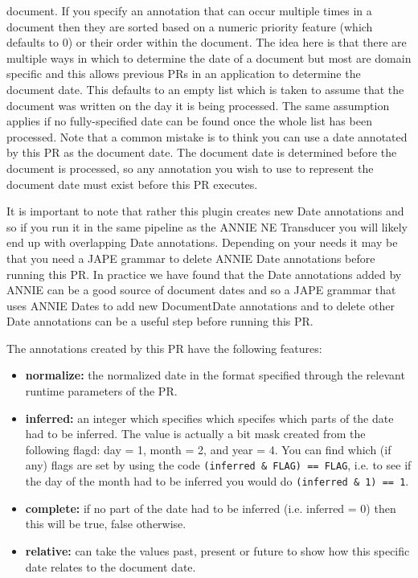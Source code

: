 \begin{itemize}
  document. If you specify an annotation that can occur multiple times in a
  document then they are sorted based on a numeric priority feature (which defaults
  to 0) or their order within the document. The idea here is that there are 
  multiple ways in which to determine the date of a document but most are domain
  specific and this allows previous PRs in an application to determine the
  document date. This defaults to an empty list which is taken to assume that
  the document was written on the day it is being processed. The same assumption
  applies if no fully-specified date can be found once the whole list has
  been processed. Note that a common mistake is to think you can use a date
  annotated by this PR as the document date. The document date is determined before
  the document is processed, so any annotation you wish to use to represent the
  document date must exist before this PR executes.
\end{itemize}

It is important to note that rather this plugin creates new Date annotations
and so if you run it in the same pipeline as the ANNIE NE Transducer you will
likely end up with overlapping Date annotations. Depending on your needs it
may be that you need a JAPE grammar to delete ANNIE Date annotations before
running this PR. In practice we have found that the Date annotations added
by ANNIE can be a good source of document dates and so a JAPE grammar that
uses ANNIE Dates to add new DocumentDate annotations and to delete other
Date annotations can be a useful step before running this PR.

The annotations created by this PR have the following features:

\begin{itemize}
\item \textbf{normalize:} the normalized date in the format specified through the
relevant runtime parameters of the PR.
\item \textbf{inferred:} an integer which specifies which specifes which parts of the
date had to be inferred. The value is actually a bit mask created from the following
flagd: day = 1, month = 2, and year = 4. You can find which (if any) flags are set
by using the code \texttt{(inferred \& FLAG) == FLAG}, i.e. to see if the day of the month
had to be inferred you would do \texttt{(inferred \& 1) == 1}.
\item \textbf{complete:} if no part of the date had to be inferred (i.e. inferred = 0) then
this will be true, false otherwise.
\item \textbf{relative:} can take the values past, present or future to show how this
specific date relates to the document date.
\end{itemize}


